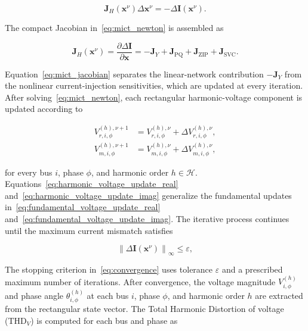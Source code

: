\documentclass[journal]{IEEEtran}
\begin{document}
\begin{equation}
\mathbf{J}_{H}(\mathbf{x}^{\nu})\Delta\mathbf{x}^{\nu}
=-\Delta\mathbf{I}(\mathbf{x}^{\nu}).
\label{eq:mict_newton}
\end{equation}

The compact Jacobian in~\eqref{eq:mict_newton} is assembled as

\begin{equation}
\mathbf{J}_{H}(\mathbf{x}^{\nu})=
\frac{\partial\Delta\mathbf{I}}{\partial\mathbf{x}}
=-\mathbf{J}_{Y}+\mathbf{J}_{\mathrm{PQ}}+
\mathbf{J}_{\mathrm{ZIP}}+\mathbf{J}_{\mathrm{SVC}}.
\label{eq:mict_jacobian}
\end{equation}

Equation~\eqref{eq:mict_jacobian} separates the linear-network contribution
$-\mathbf{J}_{Y}$ from the nonlinear current-injection sensitivities, which are
updated at every iteration. After solving~\eqref{eq:mict_newton}, each
rectangular harmonic-voltage component is updated according to

\begin{align}
V_{r,i,\phi}^{(h),\nu+1}
&=V_{r,i,\phi}^{(h),\nu}
+\Delta V_{r,i,\phi}^{(h),\nu},
\label{eq:harmonic_voltage_update_real}\\
V_{m,i,\phi}^{(h),\nu+1}
&=V_{m,i,\phi}^{(h),\nu}
+\Delta V_{m,i,\phi}^{(h),\nu},
\label{eq:harmonic_voltage_update_imag}
\end{align}

\noindent for every bus $i$, phase $\phi$, and harmonic order
$h\in\mathcal{H}$. Equations~\eqref{eq:harmonic_voltage_update_real}
and~\eqref{eq:harmonic_voltage_update_imag} generalize the fundamental updates
in~\eqref{eq:fundamental_voltage_update_real}
and~\eqref{eq:fundamental_voltage_update_imag}. The iterative process continues
until the maximum current mismatch satisfies

\begin{equation}
    \left\|\Delta\mathbf{I}(\mathbf{x}^{\nu})\right\|_{\infty}
    \leq \varepsilon,
    \label{eq:convergence}
\end{equation}

\noindent The stopping criterion in~\eqref{eq:convergence} uses tolerance
$\varepsilon$ and a prescribed maximum number of iterations. After
convergence, the voltage magnitude $V_{i,\phi}^{(h)}$
and phase angle $\theta_{i,\phi}^{(h)}$ at each bus $i$, phase $\phi$, and
harmonic order $h$ are extracted from the rectangular state vector. The
Total Harmonic Distortion of voltage (THD$_V$) is computed for each bus and
phase as
\end{document}
